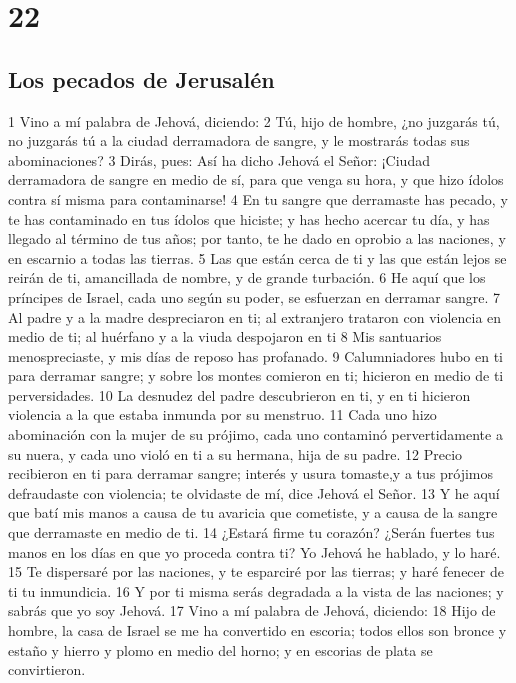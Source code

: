 \chapter{22}

\section*{Los pecados de Jerusalén}

1 Vino a mí palabra de Jehová, diciendo:
2 Tú, hijo de hombre, ¿no juzgarás tú, no juzgarás tú a la ciudad derramadora de sangre, y le mostrarás todas sus abominaciones?
3 Dirás, pues: Así ha dicho Jehová el Señor: ¡Ciudad derramadora de sangre en medio de sí, para que venga su hora, y que hizo ídolos contra sí misma para contaminarse!
4 En tu sangre que derramaste has pecado, y te has contaminado en tus ídolos que hiciste; y has hecho acercar tu día, y has llegado al término de tus años; por tanto, te he dado en oprobio a las naciones, y en escarnio a todas las tierras.
5 Las que están cerca de ti y las que están lejos se reirán de ti, amancillada de nombre, y de grande turbación.
6 He aquí que los príncipes de Israel, cada uno según su poder, se esfuerzan en derramar sangre.
7 Al padre y a la madre despreciaron en ti; al extranjero trataron con violencia en medio de ti; al huérfano y a la viuda despojaron en ti 
8 Mis santuarios menospreciaste, y mis días de reposo has profanado. 
9 Calumniadores hubo en ti para derramar sangre; y sobre los montes comieron en ti; hicieron en medio de ti perversidades.
10 La desnudez del padre descubrieron en ti, y en ti hicieron violencia a la que estaba inmunda por su menstruo.
11 Cada uno hizo abominación con la mujer de su prójimo, cada uno contaminó pervertidamente a su nuera, y cada uno violó en ti a su hermana, hija de su padre. 
12 Precio recibieron en ti para derramar sangre; interés y usura tomaste,y a tus prójimos defraudaste con violencia; te olvidaste de mí, dice Jehová el Señor.
13 Y he aquí que batí mis manos a causa de tu avaricia que cometiste, y a causa de la sangre que derramaste en medio de ti.
14 ¿Estará firme tu corazón? ¿Serán fuertes tus manos en los días en que yo proceda contra ti? Yo Jehová he hablado, y lo haré.
15 Te dispersaré por las naciones, y te esparciré por las tierras; y haré fenecer de ti tu inmundicia.
16 Y por ti misma serás degradada a la vista de las naciones; y sabrás que yo soy Jehová.
17 Vino a mí palabra de Jehová, diciendo:
18 Hijo de hombre, la casa de Israel se me ha convertido en escoria; todos ellos son bronce y estaño y hierro y plomo en medio del horno; y en escorias de plata se convirtieron.
